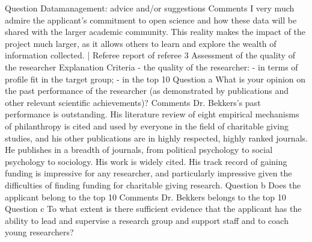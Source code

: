 \documentclass[twocolumn, serif, rga, numeric]{jote-article}
\begin{document}
Question
Datamanagement: advice and/or suggestions
Comments
I very much admire the applicant's commitment to open science and how these data will be shared with the larger academic community. This reality makes the impact of the project much larger, as it allows others to learn and explore the wealth of information collected.
| Referee report of referee 3
Assessment of the quality of the researcher
Explanation
Criteria - the quality of the researcher: - in terms of profile fit in the target group; - in the top 10%
Question a
What is your opinion on the past performance of the researcher (as demonstrated by publications and other relevant scientific achievements)?
Comments
Dr. Bekkers's past performance is outstanding. His literature review of eight empirical mechanisms of philanthropy is cited and used by everyone in the field of charitable giving studies, and his other publications are in highly respected, highly ranked journals. He publishes in a breadth of journals, from political psychology to social psychology to sociology. His work is widely cited. His track record of gaining funding is impressive for any researcher, and particularly impressive given the difficulties of finding funding for charitable giving research.
Question b
Does the applicant belong to the top 10%
Comments
Dr. Bekkers belongs to the top 10%
Question c
To what extent is there sufficient evidence that the applicant has the ability to lead and supervise a research group and support staff and to coach young researchers?
\end{document}
